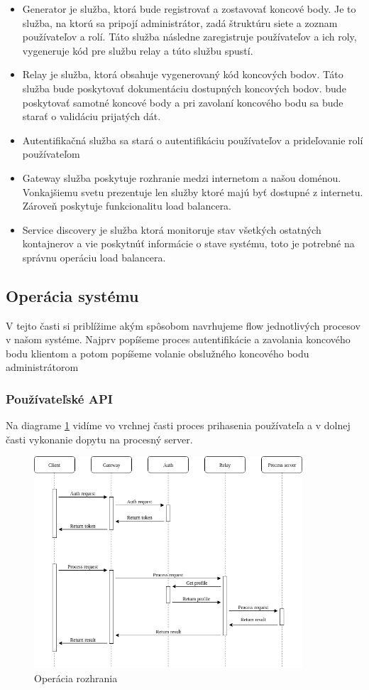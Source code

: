\begin{itemize}
\item Generator je služba, ktorá bude registrovať a zostavovať koncové body. Je to služba, na ktorú sa pripojí administrátor, zadá štruktúru siete a zoznam používateľov a rolí. Táto služba následne zaregistruje používateľov a ich roly, vygeneruje kód pre službu relay a túto službu spustí.
\item Relay je služba, ktorá obsahuje vygenerovaný kód koncových bodov. Táto služba bude poskytovať dokumentáciu dostupných koncových bodov. bude poskytovať samotné koncové body a pri zavolaní koncového bodu sa bude starať o validáciu prijatých dát.
\item Autentifikačná služba sa stará o autentifikáciu používateľov a prideľovanie rolí používateľom
\item Gateway služba poskytuje rozhranie medzi internetom a našou doménou. Vonkajšiemu svetu prezentuje len služby ktoré majú byť dostupné z internetu. Zároveň poskytuje funkcionalitu load balancera.
\item Service discovery je služba ktorá monitoruje stav všetkých ostatných kontajnerov a vie poskytnúť informácie o stave systému, toto je potrebné na správnu operáciu load balancera.
\end{itemize}


\subsection{Operácia systému}
V tejto časti si priblížime akým spôsobom navrhujeme flow jednotlivých procesov v našom systéme. Najprv popíšeme proces autentifikácie a zavolania koncového bodu klientom a potom popíšeme volanie obslužného koncového bodu administrátorom
\subsubsection{Používateľské API}
Na diagrame \ref{api_operation} vidíme vo vrchnej časti proces prihasenia používateľa a v dolnej časti vykonanie dopytu na procesný server.


\begin{figure}[!htbp]
	\centering
	\includegraphics[width=10cm]{img/api_operation.png}
	\caption{Operácia rozhrania}
	\label{api_operation}
\end{figure}

